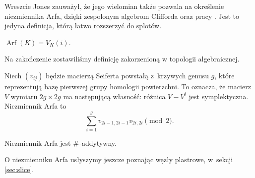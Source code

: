 Wreszcie Jones zauważył, że jego wielomian także pozwala na określenie niezmiennika Arfa, dzięki zespolonym algebrom Clifforda oraz pracy \cite{lannes85}.
Jest to jedyna definicja, którą łatwo rozszerzyć do splotów.

\begin{proposition}[Jones, 1985]
    $\operatorname{Arf}(K) = V_K(i)$.
\end{proposition}

Na zakończenie zostawiliśmy definicję zakorzenioną w topologii algebraicznej.

\begin{proposition}
    Niech $(v_{ij})$ będzie macierzą Seiferta powstałą z~krzywych genusu $g$, które reprezentują bazę pierwszej grupy homologii powierzchni.
    To oznacza, że macierz $V$ wymiaru $2g \times 2g$ ma następującą własność: różnica $V - V^t$ jest symplektyczna.
    Niezmiennik Arfa to
    \begin{equation}
        \sum^g_{i=1}v_{2i-1,2i-1}v_{2i,2i} \pmod 2.
    \end{equation}
\end{proposition}

\begin{proposition}
    Niezmiennik Arfa jest $\mathbin{\#}$-addytywny.
\end{proposition}

O niezmienniku Arfa usłyszymy jeszcze poznając węzły plastrowe, w~sekcji \ref{sec:slice}.


